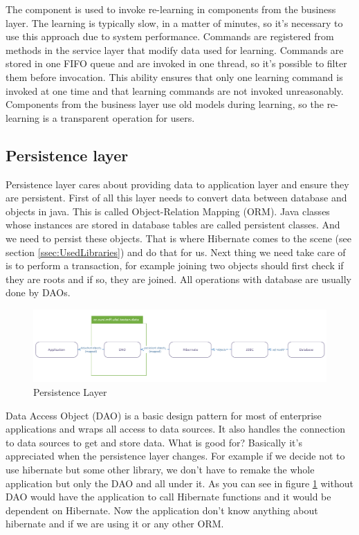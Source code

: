 The component is used to invoke re-learning in components from the business layer.
The learning is typically slow, in a matter of minutes, so it's necessary to use
this approach due to system performance. Commands are registered from methods in
the service layer that modify data used for learning. Commands are stored in one
FIFO queue and are invoked in one thread, so it's possible to filter them before
invocation. This ability ensures that only one learning command is invoked at one
time and that learning commands are not invoked unreasonably. Components from
the business layer use old models during learning, so the re-learning is a transparent
operation for users.

\subsection{Persistence layer}




Persistence layer cares about providing data to application layer and ensure they are persistent.
First of all this layer needs to convert data between database and objects in java. This is called Object-Relation Mapping (ORM). Java classes whose instances are stored in database tables are called persistent classes. And we need to persist these objects. That is where Hibernate comes to the scene (see section \ref{ssec:UsedLibraries}) and do that for us.
Next thing we need take care of is to perform a transaction, for example joining two objects should first check if they are roots and if so, they are joined. All operations with database are usually done by DAOs.
\begin{figure}[!htb]
        \centering
        \includegraphics[width=\textwidth]{Images/PersistentLayer}
        \caption{Persistence Layer}
        \label{fig:PersistentLayer}
\end{figure}
Data Access Object (DAO) is a basic design pattern for most of enterprise applications and wraps all access to data sources. It also handles the connection to data sources to get and store data. What is good for? Basically it's appreciated when the persistence layer changes. For example if we decide not to use hibernate but some other library, we don't have to remake the whole application but only the DAO and all under it.
As you can see in figure \ref{fig:PersistentLayer} without DAO would have the application to call Hibernate functions and it would be dependent on Hibernate. Now the application don't know anything about hibernate and if we are using it or any other ORM.

